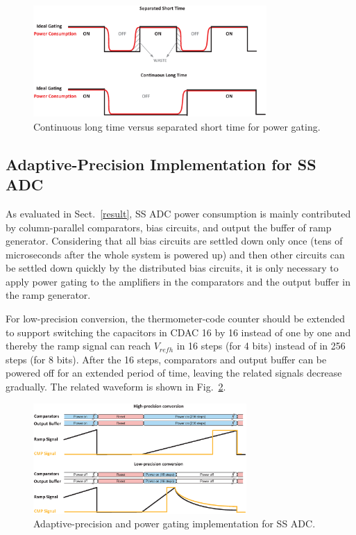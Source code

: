 \begin{figure}[htbp]
	\centerline{\includegraphics[width=3.5in]{./Figures/TIME.eps}}
	\caption{Continuous long time versus separated short time for power gating.}
	\label{TIME}
\end{figure}  

\subsection{Adaptive-Precision Implementation for SS ADC}\label{gating2}

As evaluated in Sect.~\ref{result}, SS ADC power consumption is mainly contributed by column-parallel comparators, bias circuits, and output the buffer of ramp generator. 
Considering that all bias circuits are settled down only once (tens of microseconds after the whole system is powered up) and then other circuits can be settled down quickly by the distributed 
bias circuits, it is only necessary to apply power gating to the amplifiers in the comparators and the output buffer in the ramp generator.

For low-precision conversion, the thermometer-code counter should be extended to support switching the capacitors in CDAC 16 by 16 instead of one by one and thereby the ramp signal can reach $V_{refh}$ in 16 steps (for 4 bits) instead of in 256 steps (for 8 bits). 
After the 16 steps, comparators and output buffer can be powered off for an extended period of time, leaving the related signals decrease gradually.
The related waveform is shown in Fig.~\ref{SS_pg}. 

\begin{figure}[htbp]
	\centerline{\includegraphics[width=3.2in]{./Figures/SS_pg.eps}}
	\caption{Adaptive-precision and power gating implementation for SS ADC.}
	\label{SS_pg}
\end{figure} 

